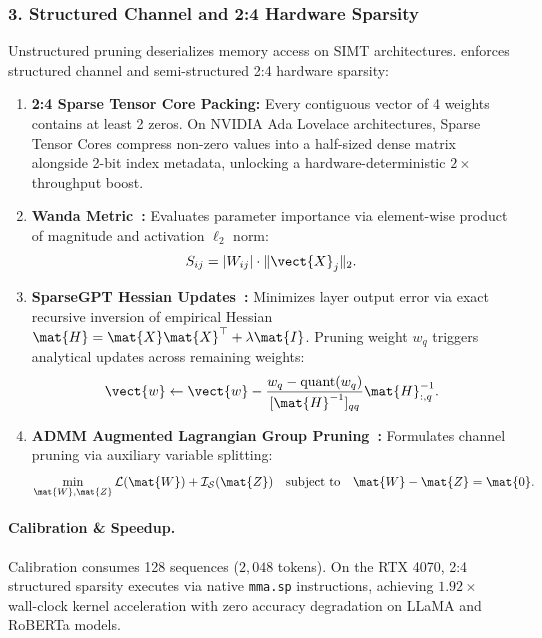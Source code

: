 \subsubsection{3. Structured Channel and 2:4 Hardware Sparsity}
\label{subsubsec:structured_sparsity}
Unstructured pruning deserializes memory access on SIMT architectures. \neuralops{} enforces structured channel and semi-structured 2:4 hardware sparsity:
\begin{enumerate}
\item \textbf{2:4 Sparse Tensor Core Packing:} Every contiguous vector of 4 weights contains at least 2 zeros. On NVIDIA Ada Lovelace architectures, Sparse Tensor Cores compress non-zero values into a half-sized dense matrix alongside 2-bit index metadata, unlocking a hardware-deterministic $2\times$ throughput boost.
\item \textbf{Wanda Metric~\cite{sun2024wanda}:} Evaluates parameter importance via element-wise product of magnitude and activation $\ell_2$ norm:
\begin{equation}
S_{ij} = |W_{ij}| \cdot \|\vect{X}_j\|_2.
\end{equation}
\item \textbf{SparseGPT Hessian Updates~\cite{frantar2022sparsegpt}:} Minimizes layer output error via exact recursive inversion of empirical Hessian $\mat{H} = \mat{X}\mat{X}^\top + \lambda \mat{I}$. Pruning weight $w_q$ triggers analytical updates across remaining weights:
\begin{equation}
\vect{w} \leftarrow \vect{w} - \frac{w_q - \operatorname{quant}(w_q)}{[\mat{H}^{-1}]_{qq}} \mat{H}^{-1}_{:, q}.
\end{equation}
\item \textbf{ADMM Augmented Lagrangian Group Pruning~\cite{boyd2011admm}:} Formulates channel pruning via auxiliary variable splitting:
\begin{equation}
\min_{\mat{W}, \mat{Z}} \mathcal{L}(\mat{W}) + \mathcal{I}_{\mathcal{S}}(\mat{Z}) \quad \text{subject to} \quad \mat{W} - \mat{Z} = \mat{0}.
\end{equation}
\end{enumerate}

\paragraph{Calibration \& Speedup.} Calibration consumes 128 sequences ($2{,}048$ tokens). On the RTX 4070, 2:4 structured sparsity executes via native \texttt{mma.sp} instructions, achieving $1.92\times$ wall-clock kernel acceleration with zero accuracy degradation on LLaMA and RoBERTa models.


